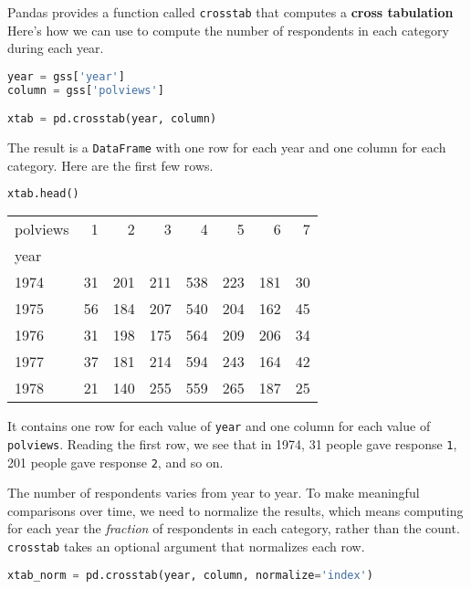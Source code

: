 Pandas provides a function called \passthrough{\lstinline!crosstab!}
that computes a \textbf{cross tabulation} Here's how we can use to
compute the number of respondents in each category during each year.

\begin{lstlisting}[language=Python,style=source]
year = gss['year']
column = gss['polviews']

xtab = pd.crosstab(year, column)
\end{lstlisting}

The result is a \passthrough{\lstinline!DataFrame!} with one row for
each year and one column for each category. Here are the first few rows.

\begin{lstlisting}[language=Python,style=source]
xtab.head()
\end{lstlisting}

\begin{tabular}{lrrrrrrr}
\toprule
polviews & 1 & 2 & 3 & 4 & 5 & 6 & 7 \\
year &  &  &  &  &  &  &  \\
\midrule
1974 & 31 & 201 & 211 & 538 & 223 & 181 & 30 \\
1975 & 56 & 184 & 207 & 540 & 204 & 162 & 45 \\
1976 & 31 & 198 & 175 & 564 & 209 & 206 & 34 \\
1977 & 37 & 181 & 214 & 594 & 243 & 164 & 42 \\
1978 & 21 & 140 & 255 & 559 & 265 & 187 & 25 \\
\bottomrule
\end{tabular}

It contains one row for each value of \passthrough{\lstinline!year!} and
one column for each value of \passthrough{\lstinline!polviews!}. Reading
the first row, we see that in 1974, 31 people gave response
\passthrough{\lstinline!1!}, 201 people gave response
\passthrough{\lstinline!2!}, and so on.

The number of respondents varies from year to year. To make meaningful
comparisons over time, we need to normalize the results, which means
computing for each year the \emph{fraction} of respondents in each
category, rather than the count. \passthrough{\lstinline!crosstab!}
takes an optional argument that normalizes each row.

\begin{lstlisting}[language=Python,style=source]
xtab_norm = pd.crosstab(year, column, normalize='index')
\end{lstlisting}


